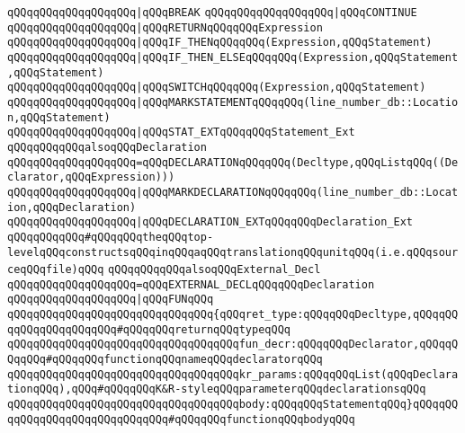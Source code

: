 \verb|qQQqqQQqqQQqqQQqqQQq|\verb#|qQQqBREAK#\newline
\verb|qQQqqQQqqQQqqQQqqQQq|\verb#|qQQqCONTINUE#\newline
\verb|qQQqqQQqqQQqqQQqqQQq|\verb#|qQQqRETURNqQQqqQQqExpression#\newline
\verb|qQQqqQQqqQQqqQQqqQQq|\verb#|qQQqIF_THENqQQqqQQq(Expression,qQQqStatement)#\newline
\verb|qQQqqQQqqQQqqQQqqQQq|\verb#|qQQqIF_THEN_ELSEqQQqqQQq(Expression,qQQqStatement,qQQqStatement)#\newline
\verb|qQQqqQQqqQQqqQQqqQQq|\verb#|qQQqSWITCHqQQqqQQq(Expression,qQQqStatement)#\newline
\verb|qQQqqQQqqQQqqQQqqQQq|\verb#|qQQqMARKSTATEMENTqQQqqQQq(line_number_db::Location,qQQqStatement)#\newline
\verb|qQQqqQQqqQQqqQQqqQQq|\verb#|qQQqSTAT_EXTqQQqqQQqStatement_Ext#\newline
\newline
\verb|qQQqqQQqqQQqalsoqQQqDeclaration|\newline
\verb|qQQqqQQqqQQqqQQqqQQq=qQQqDECLARATIONqQQqqQQq(Decltype,qQQqListqQQq((Declarator,qQQqExpression)))|\newline
\verb|qQQqqQQqqQQqqQQqqQQq|\verb#|qQQqMARKDECLARATIONqQQqqQQq(line_number_db::Location,qQQqDeclaration)#\newline
\verb|qQQqqQQqqQQqqQQqqQQq|\verb#|qQQqDECLARATION_EXTqQQqqQQqDeclaration_Ext#\newline
\newline
\verb|qQQqqQQqqQQq#qQQqqQQqtheqQQqtop-levelqQQqconstructsqQQqinqQQqaqQQqtranslationqQQqunitqQQq(i.e.qQQqsourceqQQqfile)qQQq|\newline
\verb|qQQqqQQqqQQqalsoqQQqExternal_Decl|\newline
\verb|qQQqqQQqqQQqqQQqqQQq=qQQqEXTERNAL_DECLqQQqqQQqDeclaration|\newline
\verb|qQQqqQQqqQQqqQQqqQQq|\verb#|qQQqFUNqQQq#\newline
\verb|qQQqqQQqqQQqqQQqqQQqqQQqqQQqqQQq{qQQqret_type:qQQqqQQqDecltype,qQQqqQQqqQQqqQQqqQQqqQQq#qQQqqQQqreturnqQQqtypeqQQq|\newline
\verb|qQQqqQQqqQQqqQQqqQQqqQQqqQQqqQQqqQQqfun_decr:qQQqqQQqDeclarator,qQQqqQQqqQQq#qQQqqQQqfunctionqQQqnameqQQqdeclaratorqQQq|\newline
\verb|qQQqqQQqqQQqqQQqqQQqqQQqqQQqqQQqqQQqkr_params:qQQqqQQqList(qQQqDeclarationqQQq),qQQq#qQQqqQQqK&R-styleqQQqparameterqQQqdeclarationsqQQq|\newline
\verb|qQQqqQQqqQQqqQQqqQQqqQQqqQQqqQQqqQQqbody:qQQqqQQqStatementqQQq}qQQqqQQqqQQqqQQqqQQqqQQqqQQqqQQq#qQQqqQQqfunctionqQQqbodyqQQq|\newline
